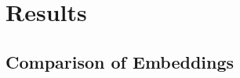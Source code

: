 \documentclass[11pt]{article}
\begin{document}
\section{Results}
\subsection{Comparison of Embeddings}






\end{document}
